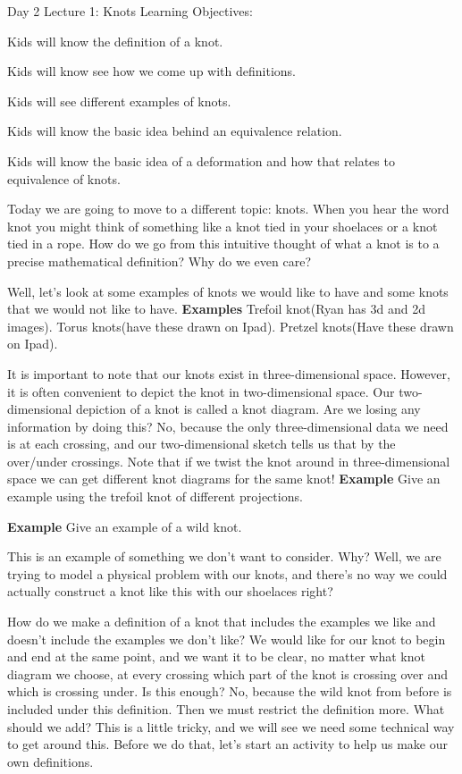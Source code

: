 \documentclass{article}
\begin{document}
\begin{section}{Day 2 Lecture 1: Knots}
Learning Objectives:


	Kids will know the definition of a knot.
	
	
	Kids will know see how we come up with definitions.
	
	
	Kids will see different examples of knots.
	
	
	Kids will know the basic idea behind an equivalence relation.
	
	
	Kids will know the basic idea of a deformation and how that relates to equivalence of knots.\medbreak
	
	
	Today we are going to move to a different topic: knots. When you hear the word knot you might think of something like a knot tied in your shoelaces or a knot tied in a rope. How do we go from this intuitive thought of what a knot is to a precise mathematical definition? Why do we even care?\medbreak
	
	 Well, let's look at some examples of knots we would like to have and some knots that we would not like to have.
	 \textbf{Examples} Trefoil knot(Ryan has 3d and 2d images). Torus knots(have these drawn on Ipad). Pretzel knots(Have these drawn on Ipad).
	 
	 It is important to note that our knots exist in three-dimensional space. However, it is often convenient to depict the knot in two-dimensional space. Our two-dimensional depiction of a knot is called a knot diagram. Are we losing any information by doing this? No, because the only three-dimensional data we need is at each crossing, and our two-dimensional sketch tells us that by the over/under crossings. Note that if we twist the knot around in three-dimensional space we can get different knot diagrams for the same knot!
	 \textbf{Example} Give an example using the trefoil knot of different projections.
	 
	 \textbf{Example} Give an example of a wild knot.
	 
	 This is an example of something we don't want to consider. Why? Well, we are trying to model a physical problem with our knots, and there's no way we could actually construct a knot like this with our shoelaces right?\medbreak
	 
	 How do we make a definition of a knot that includes the examples we like and doesn't include the examples we don't like? We would like for our knot to begin and end at the same point, and we want it to be clear, no matter what knot diagram we choose, at every crossing which part of the knot is crossing over and which is crossing under. Is this enough? No, because the wild knot from before is included under this definition. Then we must restrict the definition more. What should we add? This is a little tricky, and we will see we need some technical way to get around this. Before we do that, let's start an activity to help us make our own definitions.\medbreak
	 

\end{section}
\end{document}
